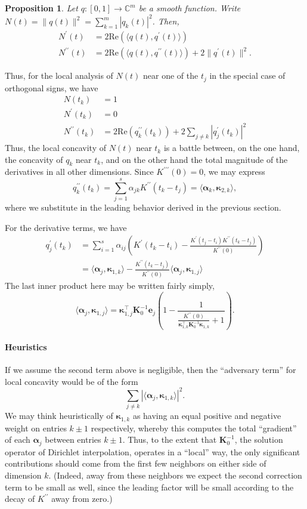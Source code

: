 \documentclass[11pt]{article}
\newcommand{\ra}{\rangle}
\newcommand{\la}{\langle}
\newcommand{\CC}{\mathbb{C}}
\renewcommand{\Re}{\mathrm{Re}}
\newcommand{\balpha}{\bm \alpha}
\newcommand{\bK}{\bm K}
\newcommand{\be}{\bm e}
\newcommand{\bkappa}{\bm \kappa}
\newtheorem{proposition}{Proposition}
\begin{document}
\begin{proposition}
    Let $q: [0, 1] \to \CC^m$ be a smooth function.
    Write $N(t) = \|q(t)\|^2 = \sum_{k = 1}^m |q_k(t)|^2$.
    Then,
    \begin{align}
      N^\prime(t) &= 2\Re(\la q(t), q^\prime(t) \ra) \\
      N^{\prime\prime}(t) &= 2\Re(\la q(t), q^{\prime\prime}(t) \ra) + 2\|q^\prime(t)\|^2.
    \end{align}
\end{proposition}
Thus, for the local analysis of $N(t)$ near one of the $t_j$ in the special case of orthogonal signs, we have
\begin{align}
  N(t_k) &= 1 \\
  N^\prime(t_k) &= 0 \\
  N^{\prime\prime}(t_k) &= 2\Re(q^{\prime\prime}_k(t_k)) + 2\sum_{j \neq k}|q_j^\prime(t_k)|^2
\end{align}
Thus, the local concavity of $N(t)$ near $t_k$ is a battle between, on the one hand, the concavity of $q_k$ near $t_k$, and on the other hand the total magnitude of the derivatives in all other dimensions.
Since $K^{\prime\prime\prime}(0) = 0$, we may express
\[ q^{\prime\prime}_k(t_k) = \sum_{j = 1}^s \alpha_{jk}K^{\prime\prime}(t_k - t_j) = \la \balpha_k, \bkappa_{2, k} \ra, \]
where we substitute in the leading behavior derived in the previous section.

For the derivative terms, we have
\begin{align}
  q^\prime_j(t_k)
  &= \sum_{i = 1}^s\alpha_{ij}\left(K^\prime(t_k - t_i) - \frac{K^\prime(t_j - t_i)K^{\prime\prime}(t_k - t_j)}{K^{\prime\prime}(0)}\right) \\
  &= \la \balpha_j, \bkappa_{1, k} \ra - \frac{K^{\prime\prime}(t_k - t_j)}{K^{\prime\prime}(0)} \la \balpha_j, \bkappa_{1, j} \ra
\end{align}
The last inner product here may be written fairly simply,
\[ \la \balpha_j, \bkappa_{1, j} \ra = \bkappa_{1, j}^\top \bK_0^{-1} \be_j\left(1 - \frac{1}{\frac{K^{\prime\prime}(0)}{\bkappa_{1, k}^\top \bK_0^{-1}\bkappa_{1, k}} + 1}\right). \]

\paragraph{Heuristics}
If we assume the second term above is negligible, then the ``adversary term'' for local concavity would be of the form
\[ \sum_{j \neq k} |\la \balpha_j, \bkappa_{1, k} \ra|^2. \]
We may think heuristically of $\bkappa_{1, k}$ as having an equal positive and negative weight on entries $k \pm 1$ respectively, whereby this computes the total ``gradient'' of each $\balpha_j$ between entries $k \pm 1$.
Thus, to the extent that $\bK_0^{-1}$, the solution operator of Dirichlet interpolation, operates in a ``local'' way, the only significant contributions should come from the first few neighbors on either side of dimension $k$.
(Indeed, away from these neighbors we expect the second correction term to be small as well, since the leading factor will be small according to the decay of $K^{\prime\prime}$ away from zero.)
\end{document}
